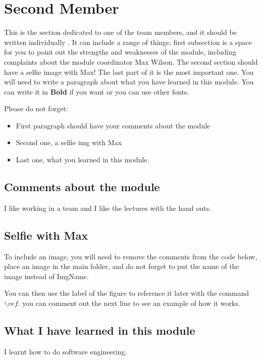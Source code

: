 \section{Second Member}
This is the section dedicated to one of the team members, and it should be written individually . It can include a range of things; first subsection is a space for you to point out the strengths and weaknesses of the module, including complaints about the module coordinator Max Wilson. The second section should have a selfie image with Max! The last part of it is the most important one. You will need to write a paragraph about what you have learned in this module. You can write it in \textbf{Bold} if you want or you can use other fonts. 

Please do not forget:
\begin{itemize}
	\item First paragraph should have your comments about the module
	\item Second one, a selfie img with Max
	\item Last one, what you learned in this module.
\end{itemize}

\subsection{Comments about the module}
I like working in a team and I like the lectures with the hand outs. 

\subsection{Selfie with Max}

To include an image, you will need to remove the comments from the code below, place an image in the main folder, and do not forget to put the name of the image instead of ImgName. 


You can then use the label of the figure to reference it later with the command ${\backslash}ref.$ you can comment out the next line to see an example of how it works.


\subsection{What I have learned in this module}
I learnt how to do software engineering.

